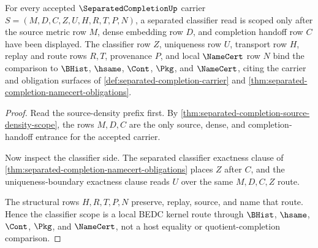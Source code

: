 \begin{theorem}
\label{thm:separated-completion-classifier-scope}
For every accepted $\SeparatedCompletionUp$ carrier $S=(M,D,C,Z,U,H,R,T,P,N)$, a separated classifier read is scoped only after the source metric row $M$, dense embedding row $D$, and completion handoff row $C$ have been displayed. The classifier row $Z$, uniqueness row $U$, transport row $H$, replay and route rows $R,T$, provenance $P$, and local $\NameCert$ row $N$ bind the comparison to $\BHist$, $\hsame$, $\Cont$, $\Pkg$, and $\NameCert$, citing the carrier and obligation surfaces of \autoref{def:separated-completion-carrier} and \autoref{thm:separated-completion-namecert-obligations}.
\end{theorem}
\begin{proof}
Read the source-density prefix first. By \autoref{thm:separated-completion-source-density-scope}, the rows $M,D,C$ are the only source, dense, and completion-handoff entrance for the accepted carrier.

Now inspect the classifier side. The separated classifier exactness clause of \autoref{thm:separated-completion-namecert-obligations} places $Z$ after $C$, and the uniqueness-boundary exactness clause reads $U$ over the same $M,D,C,Z$ route.

The structural rows $H,R,T,P,N$ preserve, replay, source, and name that route. Hence the classifier scope is a local BEDC kernel route through $\BHist$, $\hsame$, $\Cont$, $\Pkg$, and $\NameCert$, not a host equality or quotient-completion comparison.
\end{proof}

